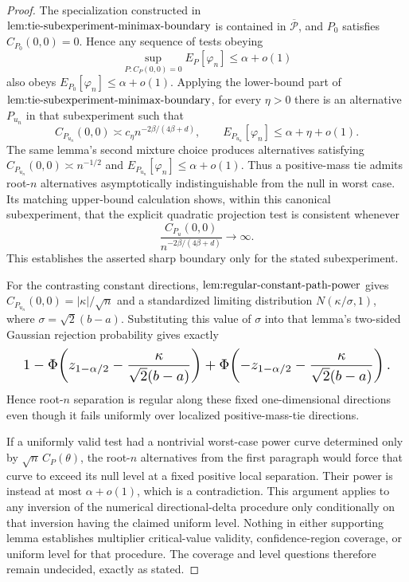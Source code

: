 \documentclass{article}
\begin{document}
\begin{proof}
The specialization constructed in \(\textup{lem:tie-subexperiment-minimax-boundary}\) is contained in \(\overline{\mathcal P}\), and \(P_0\) satisfies \(C_{P_0}(0,0)=0\). Hence any sequence of tests obeying\[\sup_{P:C_P(0,0)=0}E_P[\varphi_n]\le\alpha+o(1)\]also obeys \(E_{P_0}[\varphi_n]\le\alpha+o(1)\). Applying the lower-bound part of \(\textup{lem:tie-subexperiment-minimax-boundary}\), for every \(\eta>0\) there is an alternative \(P_{u_n}\) in that subexperiment such that\[C_{P_{u_n}}(0,0)\asymp c_\eta n^{-2\beta/(4\beta+d)},\qquad E_{P_{u_n}}[\varphi_n]\le\alpha+\eta+o(1).\]The same lemma's second mixture choice produces alternatives satisfying \(C_{P_{u_n}}(0,0)\asymp n^{-1/2}\) and \(E_{P_{u_n}}[\varphi_n]\le\alpha+o(1)\). Thus a positive-mass tie admits root-\(n\) alternatives asymptotically indistinguishable from the null in worst case. Its matching upper-bound calculation shows, within this canonical subexperiment, that the explicit quadratic projection test is consistent whenever\[\frac{C_{P_u}(0,0)}{n^{-2\beta/(4\beta+d)}}\longrightarrow\infty.\]This establishes the asserted sharp boundary only for the stated subexperiment.

For the contrasting constant directions, \(\textup{lem:regular-constant-path-power}\) gives \(C_{P_{u_n}}(0,0)=|\kappa|/\sqrt n\) and a standardized limiting distribution \(N(\kappa/\sigma,1)\), where \(\sigma=\sqrt2(b-a)\). Substituting this value of \(\sigma\) into that lemma's two-sided Gaussian rejection probability gives exactly\[
\makebox[\linewidth][c]{\resizebox{0.98\linewidth}{!}{\par\noindent \makebox[\linewidth][c]{\resizebox{0.98\linewidth}{!}{\(\displaystyle \displaystyle 1-\Phi\!\left(z_{1-\alpha/2}-\frac{\kappa}{\sqrt2(b-a)}\right)+\Phi\!\left(-z_{1-\alpha/2}-\frac{\kappa}{\sqrt2(b-a)}\right).\)}}\par\noindent}}
\]Hence root-\(n\) separation is regular along these fixed one-dimensional directions even though it fails uniformly over localized positive-mass-tie directions.

If a uniformly valid test had a nontrivial worst-case power curve determined only by \(\sqrt n\,C_P(\theta)\), the root-\(n\) alternatives from the first paragraph would force that curve to exceed its null level at a fixed positive local separation. Their power is instead at most \(\alpha+o(1)\), which is a contradiction. This argument applies to any inversion of the numerical directional-delta procedure only conditionally on that inversion having the claimed uniform level. Nothing in either supporting lemma establishes multiplier critical-value validity, confidence-region coverage, or uniform level for that procedure. The coverage and level questions therefore remain undecided, exactly as stated.
\end{proof}
\end{document}
